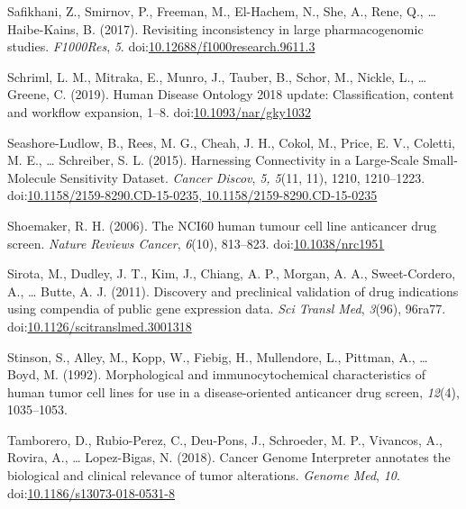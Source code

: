 \documentclass[man,floatsintext]{apa6}
\begin{document}
\hypertarget{ref-safikhani2017}{}
Safikhani, Z., Smirnov, P., Freeman, M., El-Hachem, N., She, A., Rene,
Q., \ldots{} Haibe-Kains, B. (2017). Revisiting inconsistency in large
pharmacogenomic studies. \emph{F1000Res}, \emph{5}.
doi:\href{https://doi.org/10.12688/f1000research.9611.3}{10.12688/f1000research.9611.3}

\hypertarget{ref-schriml2019}{}
Schriml, L. M., Mitraka, E., Munro, J., Tauber, B., Schor, M., Nickle,
L., \ldots{} Greene, C. (2019). Human Disease Ontology 2018 update:
Classification, content and workflow expansion, 1--8.
doi:\href{https://doi.org/10.1093/nar/gky1032}{10.1093/nar/gky1032}

\hypertarget{ref-seashore-ludlow2015}{}
Seashore-Ludlow, B., Rees, M. G., Cheah, J. H., Cokol, M., Price, E. V.,
Coletti, M. E., \ldots{} Schreiber, S. L. (2015). Harnessing
Connectivity in a Large-Scale Small-Molecule Sensitivity Dataset.
\emph{Cancer Discov}, \emph{5, 5}(11, 11), 1210, 1210--1223.
doi:\href{https://doi.org/10.1158/2159-8290.CD-15-0235,\%2010.1158/2159-8290.CD-15-0235}{10.1158/2159-8290.CD-15-0235, 10.1158/2159-8290.CD-15-0235}

\hypertarget{ref-shoemaker2006}{}
Shoemaker, R. H. (2006). The NCI60 human tumour cell line anticancer
drug screen. \emph{Nature Reviews Cancer}, \emph{6}(10), 813--823.
doi:\href{https://doi.org/10.1038/nrc1951}{10.1038/nrc1951}

\hypertarget{ref-sirota2011}{}
Sirota, M., Dudley, J. T., Kim, J., Chiang, A. P., Morgan, A. A.,
Sweet-Cordero, A., \ldots{} Butte, A. J. (2011). Discovery and
preclinical validation of drug indications using compendia of public
gene expression data. \emph{Sci Transl Med}, \emph{3}(96), 96ra77.
doi:\href{https://doi.org/10.1126/scitranslmed.3001318}{10.1126/scitranslmed.3001318}

\hypertarget{ref-stinson1992}{}
Stinson, S., Alley, M., Kopp, W., Fiebig, H., Mullendore, L., Pittman,
A., \ldots{} Boyd, M. (1992). Morphological and immunocytochemical
characteristics of human tumor cell lines for use in a disease-oriented
anticancer drug screen, \emph{12}(4), 1035--1053.

\hypertarget{ref-tamborero2018}{}
Tamborero, D., Rubio-Perez, C., Deu-Pons, J., Schroeder, M. P.,
Vivancos, A., Rovira, A., \ldots{} Lopez-Bigas, N. (2018). Cancer Genome
Interpreter annotates the biological and clinical relevance of tumor
alterations. \emph{Genome Med}, \emph{10}.
doi:\href{https://doi.org/10.1186/s13073-018-0531-8}{10.1186/s13073-018-0531-8}
\end{document}
